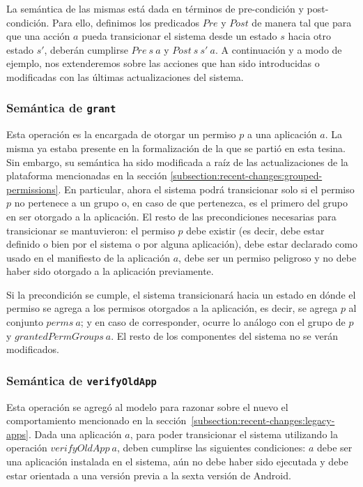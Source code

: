 La semántica de las mismas está dada en términos de pre-condición y post-condición. Para ello,
definimos los predicados $Pre$ y $Post$ de manera tal que para que una acción $a$ pueda transicionar
el sistema desde un estado $s$ hacia otro estado $s'$, deberán cumplirse $Pre\ s\ a$ y $Post\ s\ s'\ a$. A
continuación y a modo de ejemplo, nos extenderemos sobre las acciones que han sido introducidas o
modificadas con las últimas actualizaciones del sistema.

\subsubsection{Semántica de \texttt{grant}}

Esta operación es la encargada de otorgar un permiso $p$ a una aplicación $a$. La misma ya estaba
presente en la formalización de la que se partió en esta tesina. Sin embargo, su semántica ha sido
modificada a raíz de las actualizaciones de la plataforma mencionadas en la sección
\ref{subsection:recent-changes:grouped-permissions}. En particular, ahora el sistema podrá
transicionar solo si  el permiso $p$ no pertenece a un grupo o, en caso de que pertenezca, es el
primero del grupo en ser otorgado a la aplicación. El resto de las precondiciones necesarias para
transicionar se mantuvieron: el permiso $p$ debe existir (es decir, debe estar definido o bien por el
sistema o por alguna aplicación), debe estar declarado como usado en el manifiesto de la aplicación
$a$, debe ser un permiso peligroso y no debe haber sido otorgado a la aplicación previamente.

Si la precondición se cumple, el sistema transicionará hacia un estado en dónde el permiso se agrega a
los permisos otorgados a la aplicación, es decir, se agrega $p$ al conjunto $perms\ a$; y en caso de
corresponder, ocurre lo análogo con el grupo de $p$ y $grantedPermGroups\ a$. El resto de los
componentes del sistema no se verán modificados.


\subsubsection{Semántica de \texttt{verifyOldApp}}

Esta operación se agregó al modelo para razonar sobre el nuevo el comportamiento mencionado en la
sección~\ref{subsection:recent-changes:legacy-apps}. Dada una aplicación $a$, para poder transicionar
el sistema utilizando la operación $verifyOldApp\ a$, deben cumplirse las siguientes condiciones: $a$
debe ser una aplicación instalada en el sistema, aún no debe haber sido ejecutada y debe estar
orientada a una versión previa a la sexta versión de Android.

